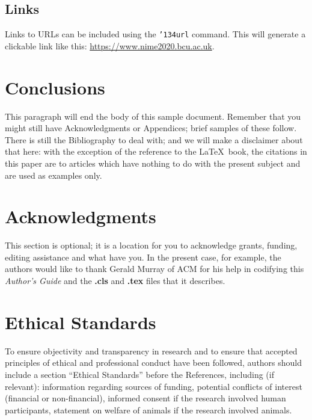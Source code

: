 \documentclass{style/nime-alternate}
\begin{document}
\subsection{Links}

Links to URLs can be included using the \texttt{{\char'134}url} command. This will generate a clickable link like this: \url{https://www.nime2020.bcu.ac.uk}.


\section{Conclusions}
This paragraph will end the body of this sample document.
Remember that you might still have Acknowledgments or
Appendices; brief samples of these
follow.  There is still the Bibliography to deal with; and
we will make a disclaimer about that here: with the exception
of the reference to the \LaTeX\ book, the citations in
this paper are to articles which have nothing to
do with the present subject and are used as
examples only.

\section{Acknowledgments}
This section is optional; it is a location for you
to acknowledge grants, funding, editing assistance and
what have you.  In the present case, for example, the
authors would like to thank Gerald Murray of ACM for
his help in codifying this \textit{Author's Guide}
and the \textbf{.cls} and \textbf{.tex} files that it describes.



\section{Ethical Standards}
To ensure objectivity and transparency in research and to ensure that accepted principles of ethical and professional conduct have been followed, authors should include a section “Ethical Standards” before the References, including (if relevant): information regarding sources of funding, potential conflicts of interest (financial or non-financial), informed consent if the research involved human participants, statement on welfare of animals if the research involved animals.


%

\end{document}
